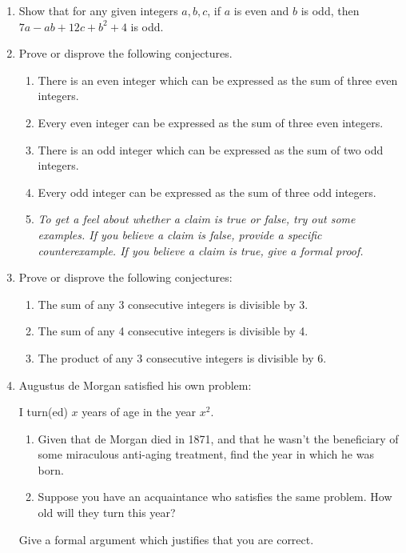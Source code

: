 \begin{enumerate}\renewcommand{\labelenumi}{\thesubsection.\theenumi}
	\item Show that for any given integers $a,b,c$, if $a$ is even and $b$ is odd, then $7a-ab+12c+b^2+4$ is odd.\goodbreak

  \item Prove or disprove the following conjectures.\prelistskip
	\begin{enumerate}
	  \item There is an even integer which can be expressed as the sum of three even integers.
	  \item Every even integer can be expressed as the sum of three even integers. 
	  \item There is an odd integer which can be expressed as the sum of two odd integers.
	  \item Every odd integer can be expressed as the sum of three odd integers.
		\item[]\emph{To get a feel about whether a claim is true or false, try out some examples. If you believe a claim is false, provide a specific counterexample. If you believe a claim is true, give a formal proof.}
\end{enumerate}

  \item Prove or disprove the following conjectures:\prelistskip
	\begin{enumerate}
	  \item The sum of any 3 consecutive integers is divisible by 3.
	  \item The sum of any 4 consecutive integers is divisible by 4.
	  \item The product of any 3 consecutive integers is divisible by 6.
	\end{enumerate}

  \item Augustus de Morgan satisfied his own problem:\prelistskip
	\begin{center}
	I turn(ed) $x$ years of age in the year $x^2$.\prelistskip
	\end{center}
	\begin{enumerate}
	  \item Given that de Morgan died in 1871, and that he wasn't the beneficiary of some miraculous anti-aging treatment, find the year in which he was born.
	  \item Suppose you have an acquaintance who satisfies the same problem. How old will they turn this year?
	\end{enumerate}%
	Give a formal argument which justifies that you are correct.
	

\end{enumerate}
